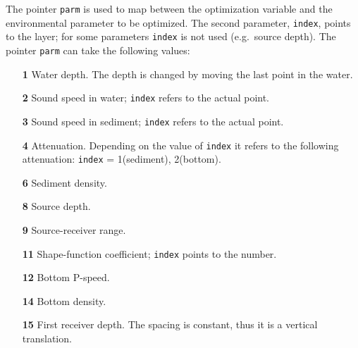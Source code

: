 \documentclass{saclantc}
\begin{document}
The pointer {\tt parm} is used to map between the optimization variable and the
environmental parameter to be optimized. The second parameter, {\tt index}, points to the
layer; for some parameters {\tt index} is not used (e.g.\ source depth).  
The pointer {\tt parm} can take the following values:
\begin{itemize}
    \item[\bf 1]  Water depth. The depth is changed by moving the last 
point in the water.
\vspace{-0.3cm}
    \item[\bf 2] Sound speed in water; {\tt index} refers to the actual point.
\vspace{-0.3cm}
    \item[\bf 3] Sound speed in sediment; {\tt index} refers to the actual point.
\vspace{-0.3cm}
    \item[\bf 4] Attenuation. Depending on the value of  {\tt index}
       it refers to the following attenuation: {\tt index} =
1(sediment), 2(bottom).
\vspace{-0.3cm}
    \item[\bf 6] Sediment density.
\vspace{-0.3cm}
    \item[\bf 8] Source depth.
\vspace{-0.3cm}
    \item[\bf 9] Source-receiver range.
\vspace{-0.3cm}
    \item[\bf 11] Shape-function coefficient; {\tt index} points to the number.
\vspace{-0.3cm}
    \item[\bf 12] Bottom P-speed.
\vspace{-0.3cm}
     \item[\bf 14] Bottom density.
\vspace{-0.3cm}
    \item[\bf 15]  First receiver depth. The spacing is constant, 
    thus it is a vertical translation.
\vspace{-0.3cm}

\end{itemize}
\end{document}
